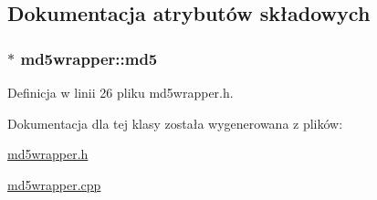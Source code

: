 \subsection{Dokumentacja atrybutów składowych}
\hypertarget{a00004_fe675f7d8993ec64ddefa902dff431fa}{
\subsubsection[{md5}]{$\ast$ {\bf md5wrapper::md5}}}
\label{d0/d0b/a00004_fe675f7d8993ec64ddefa902dff431fa}




Definicja w linii 26 pliku md5wrapper.h.

Dokumentacja dla tej klasy została wygenerowana z plików:\begin{CompactItemize}
\item 
\hyperlink{a00013}{md5wrapper.h}\item 
\hyperlink{a00012}{md5wrapper.cpp}\end{CompactItemize}
